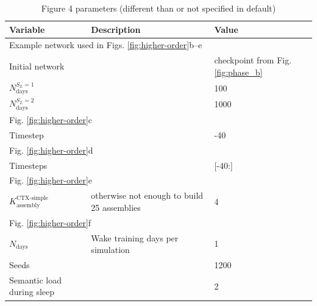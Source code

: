\documentclass{article}
\begin{document}
\begin{table}[ht]
\centering
\caption{Figure 4 parameters (different than or not specified in default)}
\label{tab:figure_4}
\begin{tabular}{lll}
\toprule
\textbf{Variable} & \textbf{Description} & \textbf{Value} \\
\midrule
\multicolumn{3}{l}{Example network used in Figs. \ref{fig:higher-order}b--e} \\
Initial network &  & checkpoint from Fig. \ref{fig:phase_b} \\
$N_\textrm{days}^{S_L=1}$ &  & 100 \\
$N_\textrm{days}^{S_L=2}$ &  & 1000 \\
\midrule
\multicolumn{3}{l}{Fig. \ref{fig:higher-order}c} \\
Timestep &  & -40\\
\midrule
\multicolumn{3}{l}{Fig. \ref{fig:higher-order}d} \\
Timesteps &  & [-40:]\\
\midrule
\multicolumn{3}{l}{Fig. \ref{fig:higher-order}e} \\
$K_\textrm{assembly}^\textrm{CTX-simple}$ & otherwise not enough to build 25 assemblies & 4 \\
\midrule
\multicolumn{3}{l}{Fig. \ref{fig:higher-order}f} \\
$N_\textrm{days}$ & Wake training days per simulation & 1 \\
Seeds & & 1200 \\
Semantic load during sleep &  & 2 \\
\bottomrule
\end{tabular}
\end{table}
\end{document}
